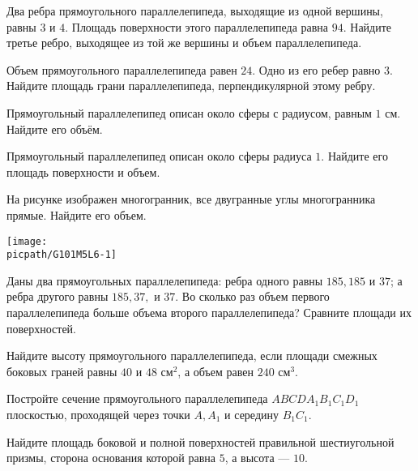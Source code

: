 \begin{class}[number=6]
	\begin{listofex}
		\item Два ребра прямоугольного параллелепипеда, выходящие из одной вершины, равны \(3\) и \(4\). Площадь поверхности этого параллелепипеда равна \(94\). Найдите третье ребро, выходящее из той же вершины и объем параллелепипеда.
		\item Объем прямоугольного параллелепипеда равен \(24\). Одно из его ребер равно \(3\). Найдите площадь грани параллелепипеда, перпендикулярной этому ребру.
		\item Прямоугольный параллелепипед описан около сферы с радиусом, равным \(1\) см. Найдите его объём.
		\item Прямоугольный параллелепипед описан около сферы радиуса \(1\). Найдите его площадь поверхности и объем.
		\item 
		\begin{minipage}[t]{\bodywidth}
			На рисунке изображен многогранник, все двугранные углы многогранника прямые. Найдите его объем.
		\end{minipage}
		\hspace{0.02\linewidth}
		\begin{minipage}[t]{\picwidth}
			\texttt{[image: \\picpath/G101M5L6-1]}
		\end{minipage}
		
		\item Даны два прямоугольных параллелепипеда: ребра одного равны \(185 , 185\) и \(37\); а ребра другого равны \(185 , 37,\) и \(37\). Во сколько раз объем первого параллелепипеда больше объема второго параллелепипеда? Сравните площади их поверхностей.
		\item Найдите высоту прямоугольного параллелепипеда, если площади смежных боковых граней равны \(40\) и \(48\) см\(^2\), а объем равен \(240\) см\(^3\).
		\item Постройте сечение прямоугольного параллелепипеда \(ABCDA_1B_1C_1D_1\) плоскостью, проходящей через точки \(A, A_1\) и середину \(B_1C_1\).
		\item Найдите площадь боковой и полной поверхностей правильной шестиугольной призмы, сторона основания которой равна \(5\), а высота --- \(10\).
	\end{listofex}
\end{class}

